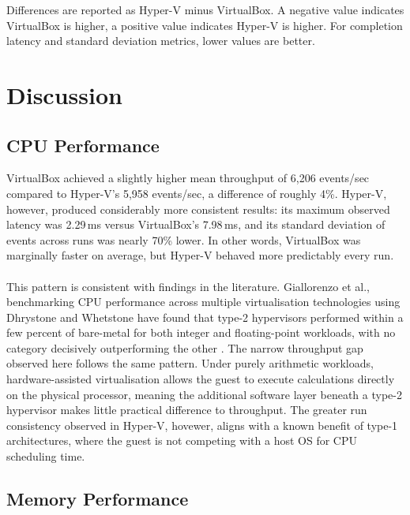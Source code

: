 \documentclass[a4paper, 12pt]{article}
\theoremstyle{plain}
\theoremstyle{definition}
\theoremstyle{remark}
\begin{document}
    \noindent Differences are reported as Hyper-V minus VirtualBox. A negative value 
    indicates VirtualBox is higher, a positive value indicates Hyper-V is higher. 
    For completion latency and standard deviation metrics, lower values are better.
    \section{Discussion}

    \subsection{CPU Performance}

    VirtualBox achieved a slightly higher mean throughput of 6{,}206 events/sec compared
    to Hyper-V's 5{,}958 events/sec, a difference of roughly 4\%. Hyper-V, however,
    produced considerably more consistent results: its maximum observed latency was 
    2.29\,ms versus VirtualBox's 7.98\,ms, and its standard deviation of events across 
    runs was nearly 70\% lower. In other words, VirtualBox was marginally faster on 
    average, but Hyper-V behaved more predictably every run.\\
    \\
    \noindent This pattern is consistent with findings in the literature. Giallorenzo et 
    al., benchmarking CPU performance across multiple virtualisation technologies using 
    Dhrystone and Whetstone have found that type-2 hypervisors performed within a few percent
    of bare-metal for both integer and floating-point workloads, with no category 
    decisively outperforming the other \parencite{giallorenzoVirtualizationCostsBenchmarking2021}. The narrow throughput gap observed here follows 
    the same pattern. Under purely arithmetic workloads, hardware-assisted 
    virtualisation allows the guest to execute calculations directly on the physical 
    processor, meaning the additional software layer beneath a type-2 hypervisor makes 
    little practical difference to throughput. The greater run consistency 
    observed in Hyper-V, hovewer, aligns with a known benefit of type-1 architectures, 
    where the guest is not competing with a host OS for CPU scheduling time.

    \subsection{Memory Performance}
\end{document}
